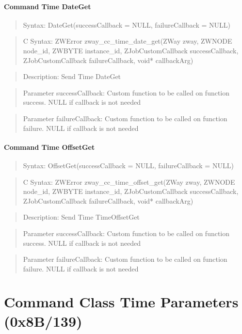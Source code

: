 \paragraph{Command Time DateGet}
\begin{quote}Syntax: DateGet(successCallback = NULL, failureCallback = NULL)\end{quote}
\begin{quote}C Syntax: ZWError zway\_cc\_time\_date\_get(ZWay zway, ZWNODE node\_id, ZWBYTE instance\_id, ZJobCustomCallback successCallback, ZJobCustomCallback failureCallback, void* callbackArg)\end{quote}
\begin{quote}Description: Send Time DateGet\end{quote}
\begin{quote}Parameter successCallback: Custom function to be called on function success. NULL if callback is not needed\end{quote}
\begin{quote}Parameter failureCallback: Custom function to be called on function failure. NULL if callback is not needed\end{quote}


\paragraph{Command Time OffsetGet}
\begin{quote}Syntax: OffsetGet(successCallback = NULL, failureCallback = NULL)\end{quote}
\begin{quote}C Syntax: ZWError zway\_cc\_time\_offset\_get(ZWay zway, ZWNODE node\_id, ZWBYTE instance\_id, ZJobCustomCallback successCallback, ZJobCustomCallback failureCallback, void* callbackArg)\end{quote}
\begin{quote}Description: Send Time TimeOffsetGet\end{quote}
\begin{quote}Parameter successCallback: Custom function to be called on function success. NULL if callback is not needed\end{quote}
\begin{quote}Parameter failureCallback: Custom function to be called on function failure. NULL if callback is not needed\end{quote}



\section{Command Class Time Parameters (0x8B/139)}

